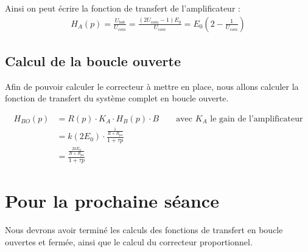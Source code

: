 \documentclass[11pt]{report}
\begin{document}
Ainsi on peut écrire la fonction de transfert de l'amplificateur : 
\begin{align*}
  H_A(p) = \frac{U_{bob}}{U_{com}} = \frac{(2 U_{com} - 1)E_0}{U_{com}} = E_0(2 - \frac{1}{U_{com}})
\end{align*}

\subsection{Calcul de la boucle ouverte}
Afin de pouvoir calculer le correcteur à mettre en place, nous allons calculer la fonction de transfert du système complet en boucle ouverte.

\begin{align*}
  H_{BO}(p) &= R(p) \cdot K_A \cdot H_B(p) \cdot B \quad\quad \text{avec $K_A$ le gain de l'amplificateur}\\ 
            &= k(2E_0) \cdot \frac{\frac{1}{R + R_{pu}}}{1+\tau p} \\
            &= \frac{\frac{2kE_0}{R+R_{pu}}}{1+\tau p}
\end{align*}



\section{Pour la prochaine séance}
Nous devrons avoir terminé les calculs des fonctions de transfert en boucle ouvertes et fermée, ainsi que le calcul du correcteur proportionnel.
\end{document}

